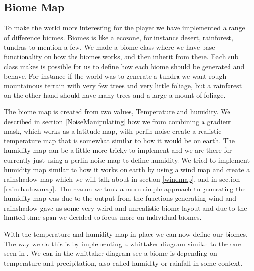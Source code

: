 \subsection{Biome Map}

To make the world more interesting for the player we have implemented a range of difference biomes. Biomes is like a ecozone, for instance desert, rainforest, tundras to mention a few. We made a biome class where we have base functionality on how the biomes works, and then inherit from there. Each sub class makes is possible for us to define how each biome should be generated and behave. For instance if the world was to generate a tundra we want rough mountainous terrain with very few trees and very little foliage, but a rainforest on the other hand should have many trees and a large a mount of foliage.

The biome map is created from two values, Temperature and humidity. We described in section \ref{NoiseManipulating} how we from combining a gradient mask, which works as a latitude map, with perlin noise create a realistic temperature map that is somewhat similar to how it would be on earth. The humidity map can be a little more tricky to implement and we are there for currently just using a perlin noise map to define humidity. We tried to implement humidity map similar to how it works on earth by using a wind map and create a rainshadow map which we will talk about in section \ref{windmap}, and in section \ref{rainshadowmap}. The reason we took a more simple approach to generating the humidity map was due to the output from the functions generating wind and rainshadow gave us some very weird and unrealistic biome layout and due to the limited time span we decided to focus more on individual biomes.

With the temperature and humidity map in place we can now define our biomes. The way we do this is by implementing a whittaker diagram similar to the one seen in . We can in the whittaker diagram see a biome is depending on temperature and precipitation, also called humidity or rainfall in some context.

